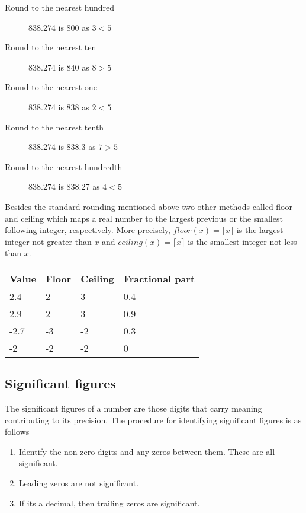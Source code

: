\begin{description}
\item [Round to the nearest hundred] 838.274 is 800 as $3 < 5$
\item [Round to the nearest ten] 838.274 is 840 as $8 > 5$
\item [Round to the nearest one] 838.274 is 838 as $2 < 5$
\item [Round to the nearest tenth] 838.274 is 838.3 as $7 > 5$
\item [Round to the nearest hundredth] 838.274 is 838.27 as $4 < 5$
\end{description}

Besides the standard rounding mentioned above two other methods called floor and ceiling which maps a real number to the largest previous or the smallest following integer, respectively. More precisely,
$floor(x) = \lfloor x \rfloor$ is the largest integer not greater than $x$ and $ceiling(x) =  \lceil x \rceil$ is the smallest integer not less than $x$.
\begin{table}[H]
\begin{tabular}{|l|l|l|l|}
\hline
\textbf{Value}  & \textbf{Floor} & \textbf{Ceiling} & \textbf{Fractional part} \\ \hline
2.4	          & 2	             & 3	              & 0.4                      \\ \hline
2.9	          & 2	             & 3	              & 0.9                      \\ \hline
-2.7	          & -3	           & -2	              & 0.3                      \\ \hline
-2	             & -2	           & -2	              & 0                        \\ \hline
\end{tabular}
\end{table}

\subsection{Significant figures}
The significant figures of a number are those digits that carry meaning contributing to its precision. The procedure for identifying significant figures is as follows
\begin{enumerate}
\item Identify the non-zero digits and any zeros between them. These are all significant.
\item Leading zeros are not significant.
\item If its a decimal, then trailing zeros are significant.
\end{enumerate}

